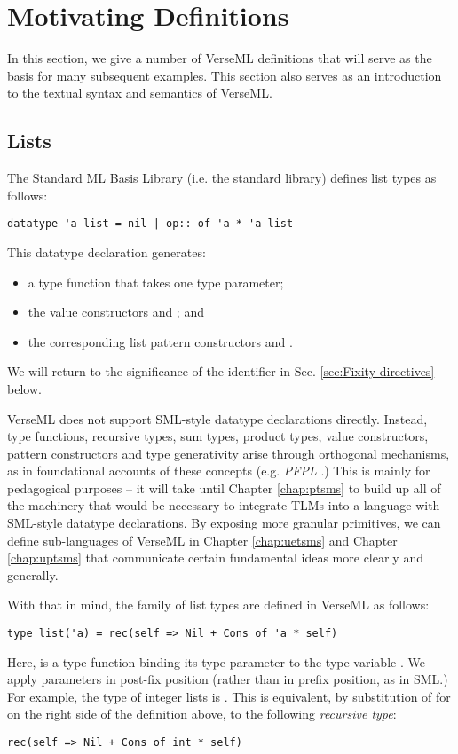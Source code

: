 \section{Motivating Definitions}\label{sec:motivating-examples}
In this section, we give a number of VerseML definitions that will serve as the basis for many subsequent examples. This section also serves as an introduction to the textual syntax and semantics of VerseML.

\subsection{Lists}\label{sec:lists}
The Standard ML Basis Library (i.e.  the standard library) defines list types as follows:
\begin{lstlisting}[numbers=none]
datatype 'a list = nil | op:: of 'a * 'a list
\end{lstlisting}
This datatype declaration generates:
\begin{itemize}
\item a type function  that takes one type parameter; 
\item the value constructors  and ; and
\item the corresponding list pattern constructors  and .
\end{itemize}
We will return to the significance of the identifier  in Sec. \ref{sec:Fixity-directives} below.

VerseML does not support SML-style datatype declarations directly. Instead, type functions, recursive types, sum types, product types, value constructors, pattern constructors and type generativity arise through orthogonal mechanisms, as in foundational accounts of these concepts (e.g. \emph{PFPL} \cite{pfpl}.) This is mainly for pedagogical purposes -- it will take until Chapter \ref{chap:ptsms} to build up all of the machinery that would be necessary to integrate TLMs into a language with SML-style datatype declarations. By exposing more granular primitives, we can define sub-languages of VerseML in Chapter \ref{chap:uetsms} and Chapter \ref{chap:uptsms} that communicate certain fundamental ideas more clearly and generally.

With that in mind, the family of list types are defined in VerseML as follows:
\begin{lstlisting}[numbers=none]
type list('a) = rec(self => Nil + Cons of 'a * self)
\end{lstlisting}
Here,  is a {type function} binding its type parameter to the type variable . We apply parameters in post-fix position (rather than in prefix position, as in SML.) For example, the type of integer lists is . This is equivalent, by substitution of  for  on the right side of the definition above, to the following \emph{recursive type}:
\begin{lstlisting}[numbers=none]
rec(self => Nil + Cons of int * self)
\end{lstlisting}

